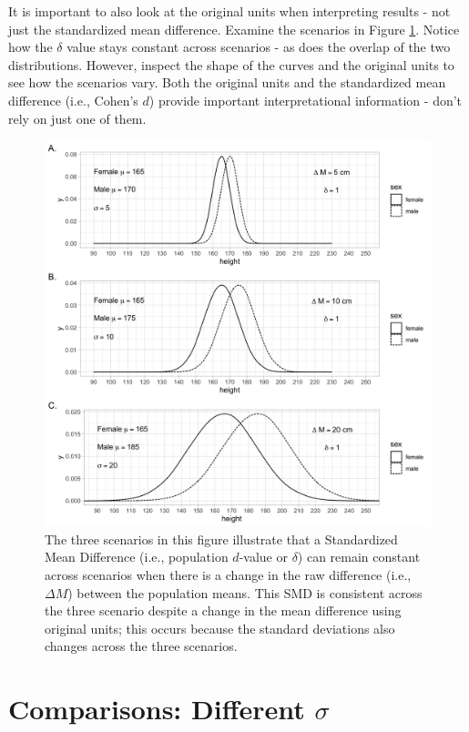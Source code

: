 \documentclass[
]{krantz}
\begin{document}
It is important to also look at the original units when interpreting results - not just the standardized mean difference. Examine the scenarios in Figure \ref{fig:dex3}. Notice how the \(\delta\) value stays constant across scenarios - as does the overlap of the two distributions. However, inspect the shape of the curves and the original units to see how the scenarios vary. Both the original units and the standardized mean difference (i.e., Cohen's \(d\)) provide important interpretational information - don't rely on just one of them.

\begin{figure}
\includegraphics[width=1\linewidth]{ch_populations/images/dvalue_ex3} \caption[Caveats for standardized mean difference]{The three scenarios in this figure illustrate that a Standardized Mean Difference (i.e., population $d$-value or $\delta$) can remain constant across scenarios when there is a change in the raw difference (i.e., $\Delta M$) between the population means. This SMD is consistent across the three scenario despite a change in the mean difference using original units; this occurs because the standard deviations also changes across the three scenarios.}\label{fig:dex3}
\end{figure}

\hypertarget{comparisons-different-sigma}{%
\section{\texorpdfstring{Comparisons: Different \(\sigma\)}{Comparisons: Different \textbackslash sigma}}\label{comparisons-different-sigma}}
\end{document}
